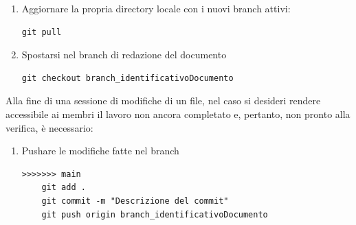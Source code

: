 \documentclass{article}
\begin{document}
\begin{enumerate}
    \begin{enumerate}
        \item Aggiornare la propria directory locale con i nuovi branch attivi:
        \begin{lstlisting}[style=code]
    git pull
        \end{lstlisting}

        \item Spostarsi nel branch di redazione del documento
        \begin{lstlisting}[style=code]
    git checkout branch_identificativoDocumento
        \end{lstlisting}
    \end{enumerate}
    Alla fine di una sessione di modifiche di un file, nel caso si desideri rendere accessibile ai membri il lavoro non ancora completato e, pertanto, non pronto alla verifica, è necessario:
    \begin{enumerate}
        \item Pushare le modifiche fatte nel branch 
        \begin{lstlisting}[style=code]
>>>>>>> main
    git add .
    git commit -m "Descrizione del commit"
    git push origin branch_identificativoDocumento
        \end{lstlisting}


\end{enumerate}
\end{enumerate}
\end{document}
